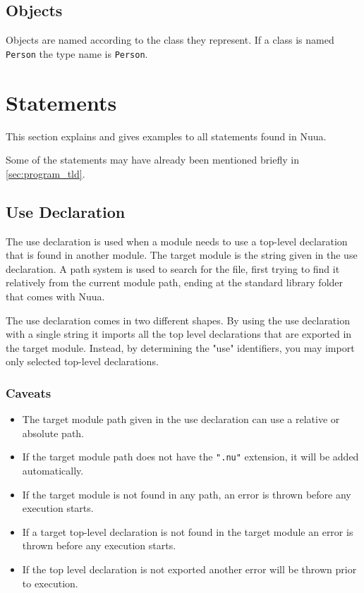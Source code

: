 \subsection{Objects}

Objects are named according to the class they represent. If a class is named \texttt{Person} the type name is \texttt{Person}.

\section{Statements}
\label{sec:statements}

This section explains and gives examples to all statements found in Nuua.

Some of the statements may have already been mentioned briefly in \autoref{sec:program_tld}.

\subsection{Use Declaration}

The use declaration is used when a module needs to use a top-level declaration
that is found in another module. The target module is the string given in the use declaration. A path system is used to search for the file,
first trying to find it relatively from the current module path, ending at the standard library folder that comes with Nuua.

The use declaration comes in two different shapes. By using the use declaration with a single string it imports all the top level
declarations that are exported in the target module. Instead, by determining the "use" identifiers, you may import only selected top-level
declarations.

\subsubsection{Caveats}

\begin{itemize}
    \item The target module path given in the use declaration can use a relative or absolute path.
    \item If the target module path does not have the \texttt{".nu"} extension, it will be added automatically.
    \item If the target module is not found in any path, an error is thrown before any execution starts.
    \item If a target top-level declaration is not found in the target module an error is thrown before any execution starts.
    \item If the top level declaration is not exported another error will be thrown prior to execution.
\end{itemize}

